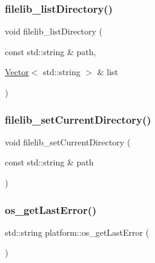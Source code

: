\subsubsection{\texorpdfstring{filelib\+\_\+list\+Directory()}{filelib\_listDirectory()}}
{\footnotesize\ttfamily void filelib\+\_\+list\+Directory (\begin{DoxyParamCaption}\item[{const std\+::string \&}]{path,  }\item[{\mbox{\hyperlink{classVector}{Vector}}$<$ std\+::string $>$ \&}]{list }\end{DoxyParamCaption})}

\mbox{\label{namespaceplatform_afe79a966d14e3b8d08939712884fa9d3}} 
\subsubsection{\texorpdfstring{filelib\+\_\+set\+Current\+Directory()}{filelib\_setCurrentDirectory()}}
{\footnotesize\ttfamily void filelib\+\_\+set\+Current\+Directory (\begin{DoxyParamCaption}\item[{const std\+::string \&}]{path }\end{DoxyParamCaption})}

\mbox{\label{namespaceplatform_a33caced893c9dd544cd80f354c5ec359}} 
\subsubsection{\texorpdfstring{os\+\_\+get\+Last\+Error()}{os\_getLastError()}}
{\footnotesize\ttfamily std\+::string platform\+::os\+\_\+get\+Last\+Error (\begin{DoxyParamCaption}{ }\end{DoxyParamCaption})}

